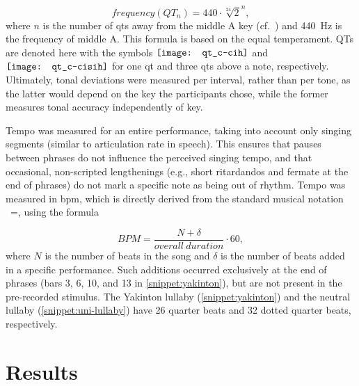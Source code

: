\begin{equation}
	\label{eq:quarter_tones_formula}
	frequency(QT_n) = 440 \cdot \sqrt[24]{2}^n,
\end{equation}
\noindent
%
where $n$ is the number of \acp{qt} away from the middle A key (cf.\ \citet{DeKlerk1979equal}) and \SI{440}{\hertz} is the frequency of middle A.
This formula is based on the equal temperament.
QTs are denoted here with the symbols \hspace{-0.18cm}
$\vcenter{\hbox{\texttt{[image: qt\_c-cih]}}}$ and 
$\vcenter{\hbox{\texttt{[image: qt\_c-cisih]}}}$ for one \ac{qt} and three \acp{qt} above a note, respectively.
Ultimately, tonal deviations were measured per interval, rather than per tone, as the latter would depend on the key the participants chose, while the former measures tonal accuracy independently of key.

Tempo was measured for an entire performance, taking into account only singing segments (similar to articulation rate in speech).
This ensures that pauses between phrases do not influence the perceived singing tempo, and that occasional, non-scripted lengthenings (e.g., short ritardandos and fermate at the end of phrases) do not mark a specific note as being out of rhythm.
Tempo was measured in \ac{bpm}, which is directly derived from the standard musical notation \musQuarter~=, using the formula

\begin{equation}
	\label{eq:bpm}
	BPM = \frac{N + \delta}{overall\ duration} \cdot 60,
\end{equation}
\noindent
%
where $N$ is the number of beats in the song and $\delta$ is the number of beats added in a specific performance.
Such additions occurred exclusively at the end of phrases (bars 3, 6, 10, and 13 in \cref{snippet:yakinton}), but are not present in the pre-recorded stimulus.
The Yakinton lullaby (\cref{snippet:yakinton}) and the neutral lullaby (\cref{snippet:uni-lullaby}) have 26 quarter beats and 32 dotted quarter beats, respectively.

\section{Results}
\label{sec:results}

